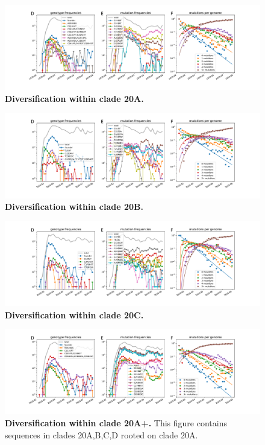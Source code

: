 \begin{figure}[h]
    \includegraphics[width=\textwidth]{figures/counts/20A_counts.pdf}
    \caption{{\bf Diversification within clade 20A.}
    \label{fig:20A_counts}}
\end{figure}

\begin{figure}[h]
    \includegraphics[width=\textwidth]{figures/counts/20B_counts.pdf}
    \caption{{\bf Diversification within clade 20B.}
    \label{fig:20B_counts}}
\end{figure}

\begin{figure}[h]
    \includegraphics[width=\textwidth]{figures/counts/20C_counts.pdf}
    \caption{{\bf Diversification within clade 20C.}
    \label{fig:20C_counts}}
\end{figure}


\begin{figure}[h]
    \includegraphics[width=\textwidth]{figures/counts/20A+_counts.pdf}
    \caption{{\bf Diversification within clade 20A+.}
    This figure contains sequences in clades 20A,B,C,D rooted on clade 20A.
    \label{fig:20A+_counts}}
\end{figure}



